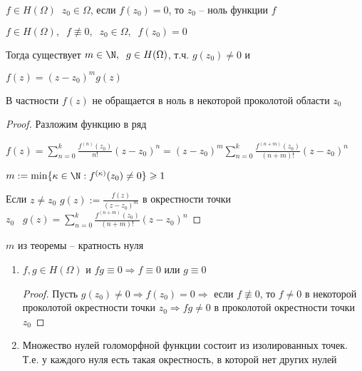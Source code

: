 
\begin{definition}\thmslashn

	$f\in H(\Omega) \;\; z_0 \in \Omega$, если $f(z_0) = 0$, то $z_0$ -- ноль функции $f$

\end{definition}

\begin{theorem}\thmslashn
	
	$f\in H(\Omega),\;\; f\not\equiv0, \;\; z_0 \in \Omega,\;\;f(z_0) = 0$
	
	Тогда существует $m \in \N, \;\; g\in H(\Omega)$, т.ч. $g(z_0)\not = 0$ и
	
	$f(z) = (z-z_0)^mg(z)$ 
	
	В частности $f(z)$ не обращается в ноль в некоторой проколотой области $z_0$
	
\end{theorem}

\begin{proof}\thmslashn
	
	Разложим функцию в ряд
	
	$f(z) = \sum\limits_{n=0}^k \frac{f^{(n)}(z_0)}{n!}(z - z_0)^n = (z-z_0)^m \sum\limits_{n=0}^k \frac{f^{(n+m)}(z_0)}{(n+m)!}(z - z_0)^n$
	
	$m:= \min\{\kappa \in \N: f^{(\kappa)}(z_0) \not = 0 \} \geqslant 1$
	
	Если $z \not = z_0$ $g(z) := \frac{f(z)}{(z-z_0)^m}$ в окрестности точки $z_0 \;\;\; g(z) = \sum\limits_{n=0}^k \frac{f^{(n+m)}(z_0)}{(n+m)!}(z - z_0)^n$
	
\end{proof}

\begin{definition}\thmslashn
	
	$m$ из теоремы -- кратность нуля
	
\end{definition}

\begin{consequence}\thmslashn
	
	\begin{enumerate}
		\item 
		$f, g \in H(\Omega)$ и $fg\equiv 0 \Rightarrow f\equiv 0$ или $g\equiv 0$

		\begin{proof}\thmslashn
			
			Пусть $g(z_0) \not = 0  \Rightarrow f(z_0) = 0 \Rightarrow$ если $f \not\equiv 0$, то $f\not=0$ в некоторой проколотой окрестности точки $z_0 \Rightarrow fg \not= 0$ в проколотой окрестности точки $z_0$
		\end{proof}

		\item
		Множество нулей голоморфной функции состоит из изолированных точек. Т.е. у каждого нуля есть такая окрестность, в которой нет других нулей
	\end{enumerate}

\end{consequence}

